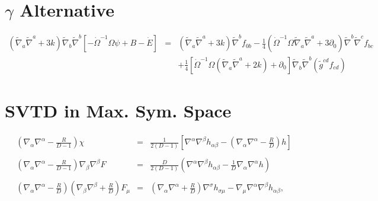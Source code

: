\documentclass[10pt,letterpaper]{article}
\numberwithin{equation}{section}
\begin{document}
\newpage
\begin{appendices}
	\section{$\gamma$ Alternative}
	\begin{eqnarray}
	 (\tilde\nabla_a\tilde\nabla^a + 3k)\tilde\nabla_b\tilde\nabla^b[ -\dot\Omega^{-1}\Omega \psi+ B-\dot E] &=& 
	(\tilde\nabla_a\tilde\nabla^a + 3k)\tilde\nabla^b f_{0b}
	-\tfrac14 (\dot\Omega^{-1}\Omega\tilde\nabla_a\tilde\nabla^a+3\partial_0)\tilde\nabla^b\tilde\nabla^c f_{bc}
	\nonumber\\
	&& +\tfrac14\left[\dot\Omega^{-1}\Omega (\tilde\nabla_a\tilde\nabla^a +2k) + \partial_0\right]\tilde\nabla_b\tilde\nabla^b (\tilde g^{cd}f_{cd})
	\end{eqnarray}
	
	\section{SVTD in Max. Sym. Space}
	\begin{eqnarray}
	\left( \nabla_\alpha\nabla^\alpha -\frac{R}{D-1}\right)\chi &=& \frac{1}{2(D-1)}\left[ \nabla^\alpha\nabla^\beta h_{\alpha\beta}  -\left(\nabla_\alpha\nabla^\alpha - \frac{R}{D}\right)h\right]
	\\ \nonumber\\
	\left(\nabla_\alpha\nabla^\alpha - \frac{R}{D-1}\right) \nabla_\beta\nabla^\beta F &=& \frac{D}{2(D-1)}\left( \nabla^\alpha\nabla^\beta h_{\alpha\beta}  - \frac{1}{D}\nabla_\alpha\nabla^\alpha h\right)
	\\ \nonumber\\
	\left(\nabla_\alpha\nabla^\alpha - \frac{R}{D}\right)\left(\nabla_\beta\nabla^\beta + \frac{R}{D}\right) F_\mu
	&=& \left(\nabla_\alpha\nabla^\alpha+\frac{R}{D}\right)\nabla^\sigma h_{\sigma\mu} - \nabla_\mu \nabla^\alpha\nabla^\beta h_{\alpha\beta},
	\end{eqnarray}
\end{appendices}
\end{document}
